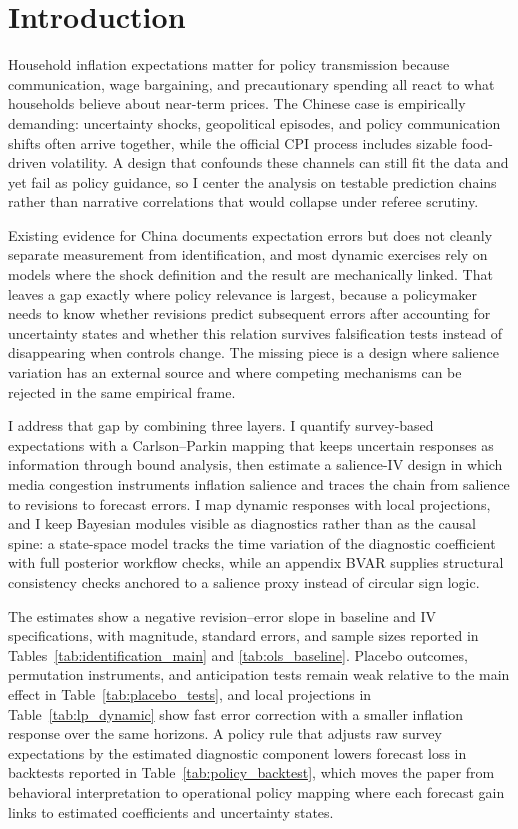 ﻿\section{Introduction}

Household inflation expectations matter for policy transmission because communication, wage bargaining, and precautionary spending all react to what households believe about near-term prices. The Chinese case is empirically demanding: uncertainty shocks, geopolitical episodes, and policy communication shifts often arrive together, while the official CPI process includes sizable food-driven volatility. A design that confounds these channels can still fit the data and yet fail as policy guidance, so I center the analysis on testable prediction chains rather than narrative correlations that would collapse under referee scrutiny.

Existing evidence for China documents expectation errors but does not cleanly separate measurement from identification, and most dynamic exercises rely on models where the shock definition and the result are mechanically linked. That leaves a gap exactly where policy relevance is largest, because a policymaker needs to know whether revisions predict subsequent errors after accounting for uncertainty states and whether this relation survives falsification tests instead of disappearing when controls change. The missing piece is a design where salience variation has an external source and where competing mechanisms can be rejected in the same empirical frame.

I address that gap by combining three layers. I quantify survey-based expectations with a Carlson--Parkin mapping that keeps uncertain responses as information through bound analysis, then estimate a salience-IV design in which media congestion instruments inflation salience and traces the chain from salience to revisions to forecast errors. I map dynamic responses with local projections, and I keep Bayesian modules visible as diagnostics rather than as the causal spine: a state-space model tracks the time variation of the diagnostic coefficient with full posterior workflow checks, while an appendix BVAR supplies structural consistency checks anchored to a salience proxy instead of circular sign logic.

The estimates show a negative revision--error slope in baseline and IV specifications, with magnitude, standard errors, and sample sizes reported in Tables~\ref{tab:identification_main} and \ref{tab:ols_baseline}. Placebo outcomes, permutation instruments, and anticipation tests remain weak relative to the main effect in Table~\ref{tab:placebo_tests}, and local projections in Table~\ref{tab:lp_dynamic} show fast error correction with a smaller inflation response over the same horizons. A policy rule that adjusts raw survey expectations by the estimated diagnostic component lowers forecast loss in backtests reported in Table~\ref{tab:policy_backtest}, which moves the paper from behavioral interpretation to operational policy mapping where each forecast gain links to estimated coefficients and uncertainty states.
